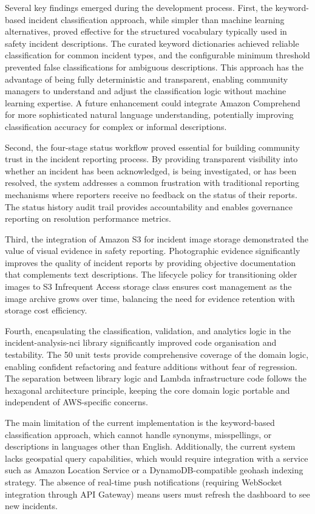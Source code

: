 \documentclass[conference]{IEEEtran}
\begin{document}
Several key findings emerged during the development process. First, the keyword-based incident classification approach, while simpler than machine learning alternatives, proved effective for the structured vocabulary typically used in safety incident descriptions. The curated keyword dictionaries achieved reliable classification for common incident types, and the configurable minimum threshold prevented false classifications for ambiguous descriptions. This approach has the advantage of being fully deterministic and transparent, enabling community managers to understand and adjust the classification logic without machine learning expertise. A future enhancement could integrate Amazon Comprehend for more sophisticated natural language understanding, potentially improving classification accuracy for complex or informal descriptions.

Second, the four-stage status workflow proved essential for building community trust in the incident reporting process. By providing transparent visibility into whether an incident has been acknowledged, is being investigated, or has been resolved, the system addresses a common frustration with traditional reporting mechanisms where reporters receive no feedback on the status of their reports. The status history audit trail provides accountability and enables governance reporting on resolution performance metrics.

Third, the integration of Amazon S3 for incident image storage demonstrated the value of visual evidence in safety reporting. Photographic evidence significantly improves the quality of incident reports by providing objective documentation that complements text descriptions. The lifecycle policy for transitioning older images to S3 Infrequent Access storage class ensures cost management as the image archive grows over time, balancing the need for evidence retention with storage cost efficiency.

Fourth, encapsulating the classification, validation, and analytics logic in the incident-analysis-nci library significantly improved code organisation and testability. The 50 unit tests provide comprehensive coverage of the domain logic, enabling confident refactoring and feature additions without fear of regression. The separation between library logic and Lambda infrastructure code follows the hexagonal architecture principle, keeping the core domain logic portable and independent of AWS-specific concerns.

The main limitation of the current implementation is the keyword-based classification approach, which cannot handle synonyms, misspellings, or descriptions in languages other than English. Additionally, the current system lacks geospatial query capabilities, which would require integration with a service such as Amazon Location Service or a DynamoDB-compatible geohash indexing strategy. The absence of real-time push notifications (requiring WebSocket integration through API Gateway) means users must refresh the dashboard to see new incidents.
\end{document}
